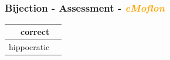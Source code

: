 \documentclass{beamer}
\newcommand{\cmark}{\ding{51}}%
\begin{document}
\begin{frame}
\begin{figure}[ht]
    \centering
    \mbox{\qquad\qquad\qquad
          }
    \label{fig:T5}
\end{figure}

\end{frame}




\begin{frame}
\frametitle{Bijection - \textbf{Assessment} - \textbf{\textit{\textcolor{orange}{eMoflon}}}}

\begin{center}
\begin{tabular}{| r | c |}
  \hline                        
  correct & \cmark\\
  \hline
  hippocratic & \cmark\\
  \hline 
\end{tabular}
\end{center}

\end{frame}
\end{document}
